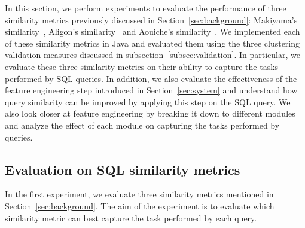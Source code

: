 In this section, we perform experiments to evaluate the performance of three similarity metrics previously discussed in Section~\ref{sec:background}: Makiyama's similarity~\cite{makiyama2015text}, Aligon's similarity~\cite{aligon2014similarity} and Aouiche's similarity~\cite{aouiche2006}. 
We implemented each of these similarity metrics in Java and evaluated them using the three clustering validation measures discussed in subsection~\ref{subsec:validation}.
In particular, we evaluate these three similarity metrics on their ability to capture the tasks performed by SQL queries.
In addition, we also evaluate the effectiveness of the feature engineering step introduced in Section~\ref{sec:system} and understand how query similarity can be improved by applying this step on the SQL query.
We also look closer at feature engineering by breaking it down to different modules and analyze the effect of each module on capturing the tasks performed by queries.

\subsection{Evaluation on SQL similarity metrics}
\label{subsec:experiments}

In the first experiment, we evaluate three similarity metrics mentioned in Section~\ref{sec:background}.
The aim of the experiment is to evaluate which similarity metric can best capture the task performed by each query.

